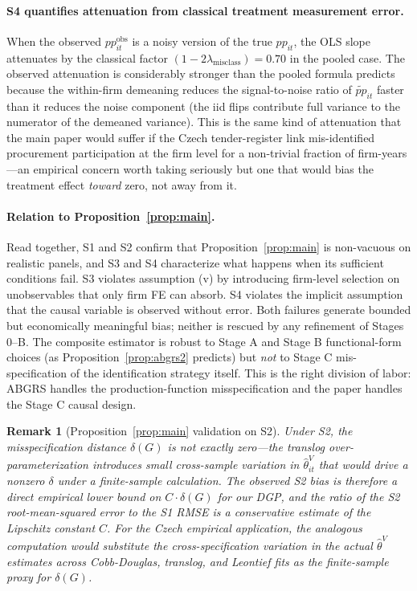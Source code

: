 \documentclass[11pt]{article}
\newtheorem{remark}{Remark}
\begin{document}
\paragraph{S4 quantifies attenuation from classical treatment measurement error.} When the observed $pp^{\text{obs}}_{it}$ is a noisy version of the true $pp_{it}$, the OLS slope attenuates by the classical factor $(1 - 2\lambda_{\text{misclass}}) = 0.70$ in the pooled case. The observed attenuation is considerably stronger than the pooled formula predicts because the within-firm demeaning reduces the signal-to-noise ratio of $\widetilde{pp}_{it}$ faster than it reduces the noise component (the iid flips contribute full variance to the numerator of the demeaned variance). This is the same kind of attenuation that the main paper would suffer if the Czech tender-register link mis-identified procurement participation at the firm level for a non-trivial fraction of firm-years---an empirical concern worth taking seriously but one that would bias the treatment effect \emph{toward} zero, not away from it.

\paragraph{Relation to Proposition~\ref{prop:main}.} Read together, S1 and S2 confirm that Proposition~\ref{prop:main} is non-vacuous on realistic panels, and S3 and S4 characterize what happens when its sufficient conditions fail. S3 violates assumption (v) by introducing firm-level selection on unobservables that only firm FE can absorb. S4 violates the implicit assumption that the causal variable is observed without error. Both failures generate bounded but economically meaningful bias; neither is rescued by any refinement of Stages 0--B. The composite estimator is robust to Stage A and Stage B functional-form choices (as Proposition~\ref{prop:abgrs2} predicts) but \emph{not} to Stage C mis-specification of the identification strategy itself. This is the right division of labor: ABGRS handles the production-function misspecification and the paper handles the Stage C causal design.

\begin{remark}[Proposition~\ref{prop:main} validation on S2]\label{rem:mc_prop1}
Under S2, the misspecification distance $\delta(G)$ is not exactly zero---the translog over-parameterization introduces small cross-sample variation in $\hat\theta^V_{it}$ that would drive a nonzero $\delta$ under a finite-sample calculation. The observed S2 bias is therefore a direct empirical lower bound on $C \cdot \delta(G)$ for our DGP, and the ratio of the S2 root-mean-squared error to the S1 RMSE is a conservative estimate of the Lipschitz constant $C$. For the Czech empirical application, the analogous computation would substitute the cross-specification variation in the actual $\hat\theta^V$ estimates across Cobb-Douglas, translog, and Leontief fits as the finite-sample proxy for $\delta(G)$.
\end{remark}
\end{document}
